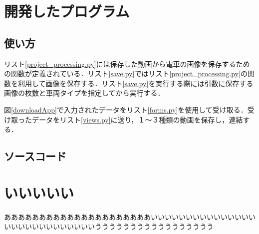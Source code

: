 

\appendix %
\chapter{開発したプログラム}
\section{使い方}
リスト\ref{project_processing.py}には保存した動画から電車の画像を保存するための関数が定義されている．リスト\ref{save.py}ではリスト\ref{project_processing.py}の関数を利用して画像を保存する．リスト\ref{save.py}を実行する際には引数に保存する画像の枚数と車両タイプを指定してから実行する．

図\ref{downloadApp}で入力されたデータをリスト\ref{forms.py}を使用して受け取る．受け取ったデータをリスト\ref{views.py}に送り，１〜３種類の動画を保存し，連結する．

\section{ソースコード}
%







%


\chapter{いいいいい}
あああああああああああああああああああああいいいいいいいいいいいいいいいいいいいいいいいいいいいいううううううううううううううううう
